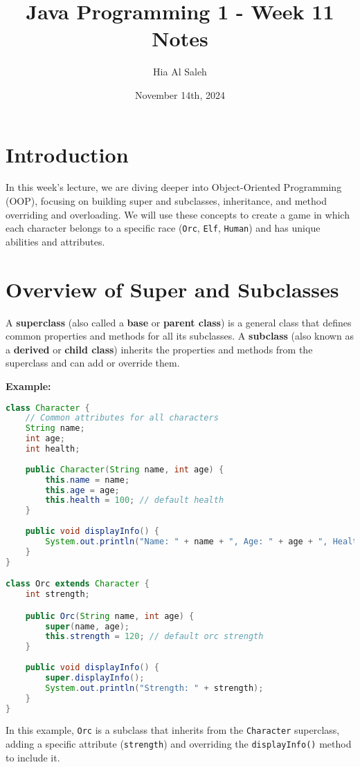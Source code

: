 \documentclass{article}
\title{Java Programming 1 - Week 11 Notes}
\author{Hia Al Saleh}
\date{November 14th, 2024}
\begin{document}
\maketitle
\tableofcontents
\newpage 

\section{Introduction}
In this week's lecture, we are diving deeper into Object-Oriented Programming (OOP), focusing on building super and subclasses, inheritance, and method overriding and overloading. We will use these concepts to create a game in which each character belongs to a specific race (\texttt{Orc}, \texttt{Elf}, \texttt{Human}) and has unique abilities and attributes.

\section{Overview of Super and Subclasses}
A \textbf{superclass} (also called a \textbf{base} or \textbf{parent class}) is a general class that defines common properties and methods for all its subclasses. A \textbf{subclass} (also known as a \textbf{derived} or \textbf{child class}) inherits the properties and methods from the superclass and can add or override them.

\textbf{Example:}
\begin{lstlisting}[language=Java]
class Character {
    // Common attributes for all characters
    String name;
    int age;
    int health;
    
    public Character(String name, int age) {
        this.name = name;
        this.age = age;
        this.health = 100; // default health
    }
    
    public void displayInfo() {
        System.out.println("Name: " + name + ", Age: " + age + ", Health: " + health);
    }
}

class Orc extends Character {
    int strength;

    public Orc(String name, int age) {
        super(name, age);
        this.strength = 120; // default orc strength
    }
    
    public void displayInfo() {
        super.displayInfo();
        System.out.println("Strength: " + strength);
    }
}
\end{lstlisting}

In this example, \texttt{Orc} is a subclass that inherits from the \texttt{Character} superclass, adding a specific attribute (\texttt{strength}) and overriding the \texttt{displayInfo()} method to include it.
\end{document}
